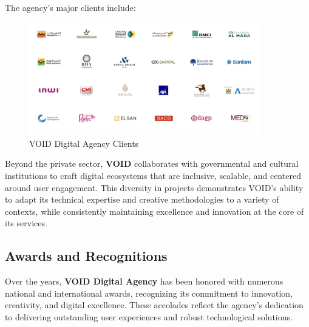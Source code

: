 \noindent
The agency's major clients include:
\begin{figure}[ht]
        \centering
        \includegraphics[width=0.9\textwidth]{images/clients-void.png}
        \caption{VOID Digital Agency Clients}
        \label{fig:void-clients}
      \end{figure}


\medskip

\noindent
Beyond the private sector, \textbf{VOID} collaborates with governmental and cultural institutions to craft digital ecosystems that are inclusive, scalable, and centered around user engagement. This diversity in projects demonstrates VOID's ability to adapt its technical expertise and creative methodologies to a variety of contexts, while consistently maintaining excellence and innovation at the core of its services.

\subsection{Awards and Recognitions}

\noindent
Over the years, \textbf{VOID Digital Agency} has been honored with numerous national and international awards, recognizing its commitment to innovation, creativity, and digital excellence. These accolades reflect the agency's dedication to delivering outstanding user experiences and robust technological solutions.

